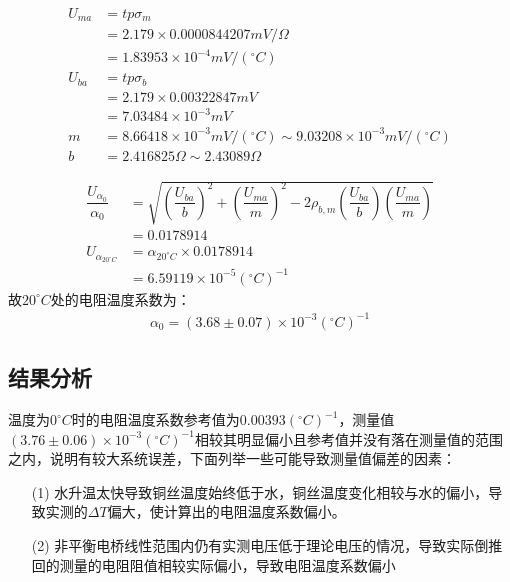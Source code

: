 \documentclass[UEF8]{ctexart}
\begin{document}
\begin{multicols}{2}
\begin{equation*}
\begin{aligned}
U_{ma}&=tp\sigma_{m} \\
& = 2.179\times{0.0000844207mV/\Omega} \\
& =1.83953\times10^{-4}mV/(^\circ{C})\\
U_{ba}&=tp\sigma_{b} \\
& = 2.179\times{0.00322847mV} \\
& =7.03484\times10^{-3}mV \\
m&=8.66418\times10^{-3}mV/(^\circ{C})\sim9.03208\times10^{-3}mV/(^\circ{C}) \\
b&=2.416825\Omega\sim2.43089\Omega 
\end{aligned}
\end{equation*}

\begin{equation*}
\begin{aligned}
\dfrac{U_{\alpha_{0}}}{\alpha_{0}}&=\sqrt{(\dfrac{U_{ba}}{b})^2+(\dfrac{U_{ma}}{m})^2-2\rho_{b,m}(\dfrac{U_{ba}}{b})(\dfrac{U_{ma}}{m})} \\
&=0.0178914 \\
U_{\alpha_{20^\circ{C}}}&=\alpha_{20^\circ{C}}\times 0.0178914 \\
&=6.59119\times 10^{-5}(^\circ{C})^{-1}
\end{aligned}
\end{equation*}
故$20^\circ{C}$处的电阻温度系数为：
\begin{equation*}
\begin{aligned}
\alpha_{0}=(3.68\pm 0.07)\times 10^{-3}(^\circ{C})^{-1}
\end{aligned}
\end{equation*}
\subsection{结果分析}
温度为$0^\circ{C}$时的电阻温度系数参考值为$0.00393(^\circ{C})^{-1}$，测量值$(3.76\pm 0.06)\times 10^{-3}(^\circ{C})^{-1}$相较其明显偏小且参考值并没有落在测量值的范围之内，说明有较大系统误差，下面列举一些可能导致测量值偏差的因素：

\begin{enumerate}
	\item[(1)]水升温太快导致铜丝温度始终低于水，铜丝温度变化相较与水的偏小，导致实测的$\Delta{T}$偏大，使计算出的电阻温度系数偏小。
	\item[(2)]非平衡电桥线性范围内仍有实测电压低于理论电压的情况，导致实际倒推回的测量的电阻阻值相较实际偏小，导致电阻温度系数偏小
\end{enumerate}


\end{multicols}
\end{document}
